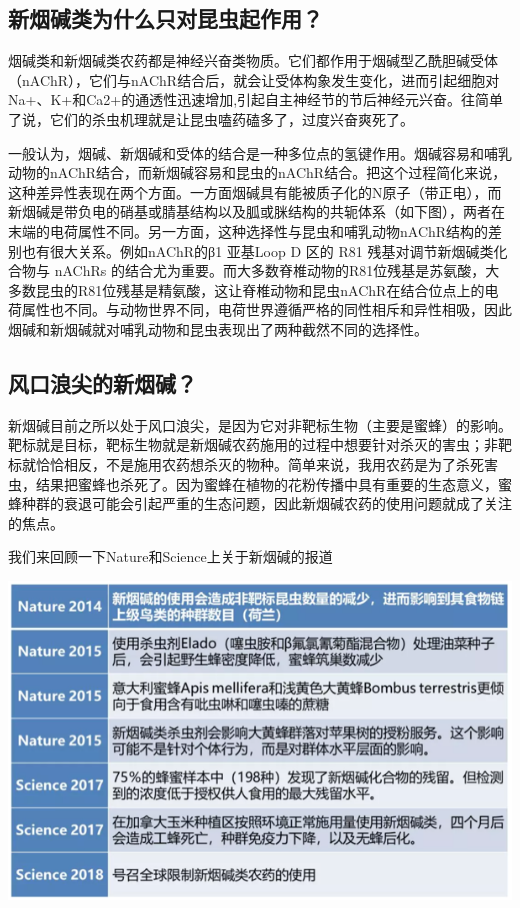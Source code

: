 \documentclass[
]{book}
\begin{document}
\hypertarget{ux65b0ux70dfux78b1ux7c7bux4e3aux4ec0ux4e48ux53eaux5bf9ux6606ux866bux8d77ux4f5cux7528}{%
\subsection{新烟碱类为什么只对昆虫起作用？}\label{ux65b0ux70dfux78b1ux7c7bux4e3aux4ec0ux4e48ux53eaux5bf9ux6606ux866bux8d77ux4f5cux7528}}

烟碱类和新烟碱类农药都是神经兴奋类物质。它们都作用于烟碱型乙酰胆碱受体（nAChR），它们与nAChR结合后，就会让受体构象发生变化，进而引起细胞对Na+、K+和Ca2+的通透性迅速增加,引起自主神经节的节后神经元兴奋。往简单了说，它们的杀虫机理就是让昆虫嗑药磕多了，过度兴奋爽死了。

一般认为，烟碱、新烟碱和受体的结合是一种多位点的氢键作用。烟碱容易和哺乳动物的nAChR结合，而新烟碱容易和昆虫的nAChR结合。把这个过程简化来说，这种差异性表现在两个方面。一方面烟碱具有能被质子化的N原子（带正电），而新烟碱是带负电的硝基或腈基结构以及胍或脒结构的共轭体系（如下图），两者在末端的电荷属性不同。另一方面，这种选择性与昆虫和哺乳动物nAChR结构的差别也有很大关系。例如nAChR的β1 亚基Loop D 区的 R81 残基对调节新烟碱类化合物与 nAChRs 的结合尤为重要。而大多数脊椎动物的R81位残基是苏氨酸，大多数昆虫的R81位残基是精氨酸，这让脊椎动物和昆虫nAChR在结合位点上的电荷属性也不同。与动物世界不同，电荷世界遵循严格的同性相斥和异性相吸，因此烟碱和新烟碱就对哺乳动物和昆虫表现出了两种截然不同的选择性。

\hypertarget{ux98ceux53e3ux6d6aux5c16ux7684ux65b0ux70dfux78b1-1}{%
\subsection{风口浪尖的新烟碱？}\label{ux98ceux53e3ux6d6aux5c16ux7684ux65b0ux70dfux78b1-1}}

新烟碱目前之所以处于风口浪尖，是因为它对非靶标生物（主要是蜜蜂）的影响。靶标就是目标，靶标生物就是新烟碱农药施用的过程中想要针对杀灭的害虫；非靶标就恰恰相反，不是施用农药想杀灭的物种。简单来说，我用农药是为了杀死害虫，结果把蜜蜂也杀死了。因为蜜蜂在植物的花粉传播中具有重要的生态意义，蜜蜂种群的衰退可能会引起严重的生态问题，因此新烟碱农药的使用问题就成了关注的焦点。

我们来回顾一下Nature和Science上关于新烟碱的报道

\includegraphics[width=8.33in]{images/xyj1}
\end{document}
